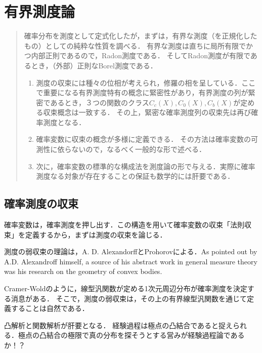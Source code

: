 \documentclass[uplatex,dvipdfmx]{jsreport}
\begin{document}
\chapter{有界測度論}

\begin{quotation}
    確率分布を測度として定式化したが，まずは，有界な測度（を正規化したもの）としての純粋な性質を調べる．
    有界な測度は直ちに局所有限でかつ内部正則であるので，Radon測度である．
    そしてRadon測度が有限であるとき，（外部）正則なBorel測度である．
    \begin{enumerate}
        \item 測度の収束には種々の位相が考えられ，修羅の相を呈している．ここで重要になる有界測度特有の概念に緊密性があり，有界測度の列が緊密であるとき，３つの関数のクラス$C_c(X),C_0(X),C_b(X)$が定める収束概念は一致する．
        その上，緊密な確率測度列の収束先は再び確率測度となる．
        \item 確率変数に収束の概念が多様に定義できる．
        その方法は確率変数の可測性に依らないので，なるべく一般的な形で述べる．
        \item 次に，確率変数の標準的な構成法を測度論の形で与える．実際に確率測度なる対象が存在することの保証も数学的には肝要である．
    \end{enumerate}
\end{quotation}

\section{確率測度の収束}

\begin{tcolorbox}[colframe=ForestGreen, colback=ForestGreen!10!white,breakable,colbacktitle=ForestGreen!40!white,coltitle=black,fonttitle=\bfseries\sffamily,
    title=Banach空間論の発展を後押しした消息]
    確率変数は，確率測度を押し出す．この構造を用いて確率変数の収束「法則収束」を定義するから，まずは測度の収束を論じる．

    測度の弱収束の理論は，A. D. AlexandorffとProhorovによる．As pointed out by A.D. Alexandroﬀ himself, a source of his abstract work
    in general measure theory was his research on the geometry of convex bodies.

    Cramer-Woldのように，線型汎関数が定める1次元周辺分布が確率測度を決定する消息がある．
    そこで，測度の弱収束は，その上の有界線型汎関数を通じて定義することは自然である．

    凸解析と関数解析が肝要となる．
    経験過程は極点の凸結合であると捉えられる．極点の凸結合の極限で真の分布を探そうとする営みが経験過程論であるか！？
\end{tcolorbox}
\end{document}
